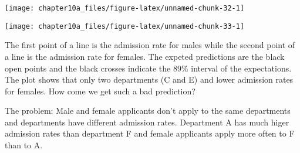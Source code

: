 \documentclass[]{tufte-handout}
\newenvironment{Shaded}{}{}
\newcommand{\KeywordTok}[1]{\textcolor[rgb]{0.00,0.44,0.13}{\textbf{#1}}}
\newcommand{\DataTypeTok}[1]{\textcolor[rgb]{0.56,0.13,0.00}{#1}}
\newcommand{\DecValTok}[1]{\textcolor[rgb]{0.25,0.63,0.44}{#1}}
\newcommand{\FloatTok}[1]{\textcolor[rgb]{0.25,0.63,0.44}{#1}}
\newcommand{\StringTok}[1]{\textcolor[rgb]{0.25,0.44,0.63}{#1}}
\newcommand{\CommentTok}[1]{\textcolor[rgb]{0.38,0.63,0.69}{\textit{#1}}}
\newcommand{\ControlFlowTok}[1]{\textcolor[rgb]{0.00,0.44,0.13}{\textbf{#1}}}
\newcommand{\OperatorTok}[1]{\textcolor[rgb]{0.40,0.40,0.40}{#1}}
\newcommand{\NormalTok}[1]{#1}
\begin{document}
\texttt{[image: chapter10a\_files/figure-latex/unnamed-chunk-32-1]}

\begin{Shaded}
\end{Shaded}

\texttt{[image: chapter10a\_files/figure-latex/unnamed-chunk-33-1]}

The first point of a line is the admission rate for males while the
second point of a line is the admission rate for females. The expeted
predictions are the black open points and the black crosses indicate the
89\% interval of the expectations. The plot shows that only two
departments (C and E) and lower admission rates for females. How come we
get such a bad prediction?

The problem: Male and female applicants don't apply to the same
departments and departments have different admission rates. Department A
has much higer admission rates than department F and female applicants
apply more often to F than to A.
\end{document}
